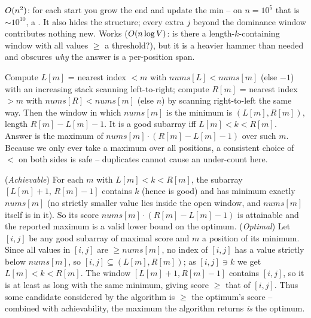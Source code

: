 \begin{thinkbox}
{$O(n^2)$: for each start you grow the end and update the min -- on $n=10^5$ that is $\sim 10^{10}$,
a \tle. It also hides the structure; every extra $j$ beyond the dominance window contributes nothing new.}
{Works ($O(n\log V)$: is there a length-$k$-containing window with all values $\ge$ a threshold?),
but it is a heavier hammer than needed and obscures \emph{why} the answer is a per-position span.}
\end{thinkbox}

Compute $L[m]$ = nearest index $< m$ with $\mathit{nums}[L]<\mathit{nums}[m]$ (else $-1$) with an
increasing stack scanning left-to-right; compute $R[m]$ = nearest index $> m$ with
$\mathit{nums}[R]<\mathit{nums}[m]$ (else $n$) by scanning right-to-left the same way. Then the window
in which $\mathit{nums}[m]$ is the minimum is $(L[m], R[m])$, length $R[m]-L[m]-1$. It is a good
subarray iff $L[m] < k < R[m]$. Answer is the maximum of $\mathit{nums}[m]\cdot(R[m]-L[m]-1)$ over such
$m$. Because we only ever take a maximum over all positions, a consistent choice of $<$ on both sides is
safe -- duplicates cannot cause an under-count here.

\begin{proofbox}
(\emph{Achievable}) For each $m$ with $L[m]<k<R[m]$, the subarray $[L[m]+1,\, R[m]-1]$ contains $k$
(hence is good) and has minimum exactly $\mathit{nums}[m]$ (no strictly smaller value lies inside the
open window, and $\mathit{nums}[m]$ itself is in it). So its score $\mathit{nums}[m]\cdot(R[m]-L[m]-1)$
is attainable and the reported maximum is a valid lower bound on the optimum. (\emph{Optimal}) Let
$[i,j]$ be any good subarray of maximal score and $m$ a position of its minimum. Since all values in
$[i,j]$ are $\ge \mathit{nums}[m]$, no index of $[i,j]$ has a value strictly below $\mathit{nums}[m]$,
so $[i,j]\subseteq (L[m], R[m])$; as $[i,j]\ni k$ we get $L[m]<k<R[m]$. The window
$[L[m]+1,R[m]-1]$ contains $[i,j]$, so it is at least as long with the same minimum, giving score
$\ge$ that of $[i,j]$. Thus some candidate considered by the algorithm is $\ge$ the optimum's score --
combined with achievability, the maximum the algorithm returns \emph{is} the optimum. \end{proofbox}

